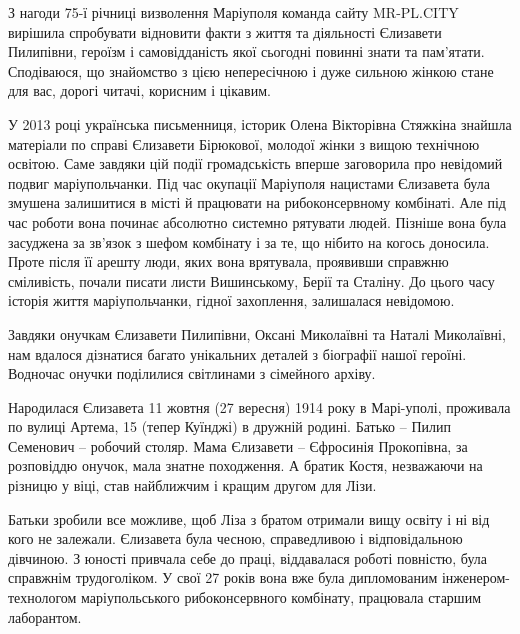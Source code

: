 З нагоди 75-ї річниці визволення Маріуполя команда сайту MR\hyp{}PL.CITY вирішила
спробувати відновити факти з життя та діяльності Єлизавети Пилипівни, героїзм і
самовідданість якої сьогодні повинні знати та пам'ятати. Сподіваюся, що
знайомство з цією непересічною і дуже сильною жінкою стане для вас, дорогі
читачі, корисним і цікавим.


У 2013 році українська письменниця, історик Олена Вікторівна Стяжкіна знайшла
матеріали по справі Єлизавети Бірюкової, молодої жінки з вищою технічною
освітою. Саме завдяки цій події громадськість вперше заговорила про невідомий
подвиг маріупольчанки. Під час окупації Маріуполя нацистами Єлизавета була
змушена залишитися в місті й працювати на рибоконсервному комбінаті. Але під
час роботи вона починає абсолютно системно рятувати людей. Пізніше вона була
засуджена за зв'язок з шефом комбінату і за те, що нібито на когось доносила.
Проте після її арешту люди, яких вона врятувала, проявивши справжню сміливість,
почали писати листи Вишинському, Берії та Сталіну. До цього часу історія життя
маріупольчанки, гідної захоплення, залишалася невідомою.


Завдяки онучкам Єлизавети Пилипівни, Оксані Миколаївні та Наталі Миколаївні,
нам вдалося дізнатися багато унікальних деталей з біографії нашої героїні.
Водночас онучки поділилися світлинами з сімейного архіву.

Народилася Єлизавета 11 жовтня (27 вересня) 1914 року в Марі\hyp{}уполі, проживала по
вулиці Артема, 15 (тепер Куїнджі) в дружній родині. Батько – Пилип Семенович –
робочий столяр. Мама Єлизавети – Єфросинія Прокопівна, за розповіддю онучок,
мала знатне походження. А братик Костя, незважаючи на різницю у віці, став
найближчим і кращим другом для Лізи.


Батьки зробили все можливе, щоб Ліза з братом отримали вищу освіту і ні від
кого не залежали. Єлизавета була чесною, справедливою і відповідальною
дівчиною. З юності привчала себе до праці, віддавалася роботі повністю, була
справжнім трудоголіком. У свої 27 років вона вже була дипломованим
інженером-технологом маріупольського рибоконсервного комбінату, працювала
старшим лаборантом.

